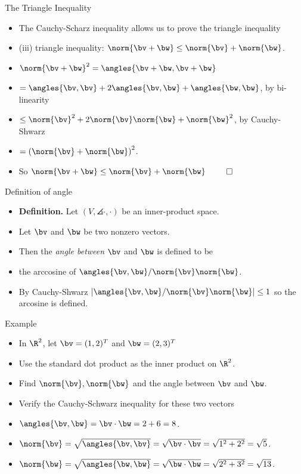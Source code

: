 \documentclass{beamer}
\begin{document}
\begin{frame}{The Triangle Inequality}

\begin{itemize}
\item The Cauchy-Scharz inequality allows us to prove the triangle inequality
\item (iii) triangle inequality: $\norm{\bv+\bw} \leq \norm{\bv} + \norm{\bw}$.
\item $\norm{\bv+\bw}^2 = \angles{\bv+\bw,\bv+\bw}$
\item $=\angles{\bv,\bv}+2\angles{\bv,\bw} +\angles{\bw,\bw}$, by bi-linearity
\item $\leq \norm{\bv}^2+2\norm{\bv}\norm{\bw} +\norm{\bw}^2$, by Cauchy-Shwarz
\item $= \left(\norm{\bv} + \norm{\bw}\right)^2$.
\item So $\norm{\bv+\bw} \leq \norm{\bv} + \norm{\bw}$ $\qed$
\end{itemize}
\end{frame}

\begin{frame}{Definition of angle}

\begin{itemize}
\item \textbf{Definition.} Let $\left(V, \angles{\cdot,\cdot}\right)$ be an inner-product space.
\item Let $\bv$ and $\bw$ be two nonzero vectors.
\item Then the \emph{angle between} $\bv$ and $\bw$ is defined to be
\item the arccosine of $\angles{\bv,\bw}/\norm{\bv}\norm{\bw}$.
\item By Cauchy-Shwarz $\lvert\angles{\bv,\bw}/\norm{\bv}\norm{\bw}\rvert\leq 1$ so the arcosine is defined.
\end{itemize}
\end{frame}

\begin{frame}{Example}

\begin{itemize}
\item In $\R^2$, let $\bv=(1,2)^{T}$ and $\bw=(2,3)^{T}$
\item Use the standard dot product as the inner product on $\R^2$.
\item Find $\norm{\bv}, \norm{\bw}$ and the angle between $\bv$ and $\bw$.
\item Verify the Cauchy-Schwarz inequality for these two vectors
\item $\angles{\bv,\bw} = \bv\cdot\bw = 2 + 6 = 8$.
\item $\norm{\bv} = \sqrt{\angles{\bv,\bv}} =\sqrt{\bv\cdot\bv} = \sqrt{1^2+2^2} = \sqrt{5}$.
\item $\norm{\bw} = \sqrt{\angles{\bw,\bw}} =\sqrt{\bw\cdot\bw} = \sqrt{2^2+3^2} = \sqrt{13}$.
\end{itemize}
\end{frame}
\end{document}
